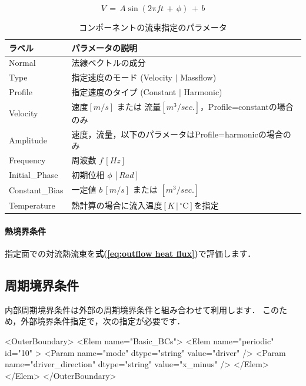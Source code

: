 \begin{equation}
V \,{=}\, A \sin \left( 2 \mathrm{\pi} ft \,+\, \phi \right) \,+\, b
\label{eq:harmonic_inner}
\end{equation}

\begin{table}[htdp]
\caption{コンポーネントの流束指定のパラメータ}
\begin{center}
\small
\begin{tabular}{ll} \toprule
ラベル & パラメータの説明\\ \midrule
Normal & 法線ベクトルの成分\\
Type & 指定速度のモード (Velocity $|$ Massflow)\\
Profile & 指定速度のタイプ (Constant $|$ Harmonic)\\
Velocity & 速度$[m/s]$ または 流量$[m^3/sec.]$，Profile=constantの場合のみ\\
Amplitude & 速度，流量，以下のパラメータはProfile=harmonicの場合のみ\\
Frequency & 周波数 $f\, [Hz]$\\
Initial\_Phase & 初期位相 $\phi\, [Rad]$\\
Constant\_Bias & 一定値 $b\, [m/s]$ または $[m^3/sec.]$\\
Temperature & 熱計算の場合に流入温度$[K\,|\,{}^\circ\mathrm{C}]$を指定\\
\bottomrule
\end{tabular}
\end{center}
\label{tbl:spec_vel}
\end{table}

\paragraph{熱境界条件}
指定面での対流熱流束を\textbf{式(\ref{eq:outflow heat flux})}で評価します．


\subsection{周期境界条件}
内部周期境界条件は外部の周期境界条件と組み合わせて利用します．
このため，外部境界条件指定で，次の指定が必要です．

{\small
\begin{program}
<OuterBoundary>
  <Elem name="Basic_BCs">
    <Elem name="periodic" id="10" >
      <Param name="mode"             dtype="string" value="driver" />
      <Param name="driver_direction" dtype="string" value="x_minus" />
    </Elem>
  </Elem>
</OuterBoundary>
\end{program}
}

